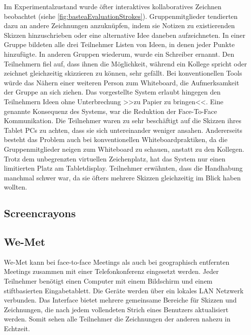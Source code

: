 \medskip Im Experimentalzustand wurde öfter interaktives kollaboratives Zeichnen beobachtet (siehe \autoref{fig:basteaEvaluationStrokes}). Gruppenmitglieder tendierten dazu an andere Zeichnungen anzuknüpfen, indem sie Notizen zu existierenden Skizzen hinzuschrieben oder eine alternative Idee daneben aufzeichneten. In einer Gruppe bildeten alle drei Teilnehmer Listen von Ideen, in denen jeder Punkte hinzufügte. In anderen Gruppen wiederum, wurde ein Schreiber ernannt.
Den Teilnehmern fiel auf, dass ihnen die Möglichkeit, während ein Kollege spricht oder zeichnet gleichzeitig skizzieren zu können, sehr gefällt. Bei konventionellen Tools würde das Nähern einer weiteren Person zum Whiteboard, die Aufmerksamkeit der Gruppe an sich ziehen. Das vorgestellte System erlaubt hingegen den Teilnehmern Ideen ohne Unterbrechung >>zu Papier zu bringen<<. 
Eine genannte Konsequenz des Systems, war die Reduktion der Face-To-Face Kommunikation. Die Teilnehmer waren zu sehr beschäftigt auf die Skizzen ihres Tablet PCs zu achten, dass sie sich untereinander weniger ansahen. Andererseits besteht das Problem auch bei konventionellen Whiteboardpraktiken, da die Gruppenmitglieder neigen zum Whiteboard zu schauen, anstatt zu den Kollegen.
Trotz dem unbegrenzten virtuellen Zeichenplatz, hat das System nur einen limitierten Platz am Tabletdisplay. Teilnehmer erwähnten, dass die Handhabung manchmal schwer war, da sie öfters mehrere Skizzen gleichzeitig im Blick haben wollten.

\subsection{Screencrayons}


\subsection{We-Met}
We-Met \citep{Wolf:1997p75} kann bei face-to-face Meetings als auch bei geographisch entfernten Meetings zusammen mit einer Telefonkonferenz eingesetzt werden. Jeder Teilnehmer benötigt einen Computer mit einem Bildschirm und einem stiftbasierten Eingabetablett. Die Geräte werden über ein lokales LAN Netzwerk verbunden. Das Interface bietet mehrere gemeinsame Bereiche für Skizzen und Zeichnungen, die nach jedem vollendeten Strich eines Benutzers aktualisiert werden. Somit sehen alle Teilnehmer die Zeichnungen der anderen nahezu in Echtzeit.

